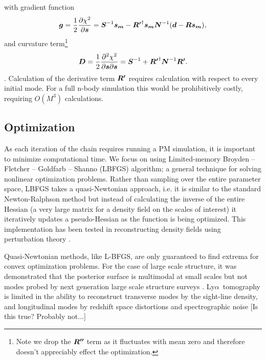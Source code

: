 \documentclass[usenatbib,onecolumn]{mnras}
\def\bi#1{\hbox{\boldmath{$#1$}}}
\newcommand{\lya}{Ly$\alpha$}
\begin{document}
with gradient function
\begin{equation}
\bi{g}=\frac{1}{2}\frac{\partial \chi^2}{\partial \bi{s}}=\bi{S}^{-1}\bi{s_m}-\bi{R'}^\dag\bi{s_m}\bi{N}^{-1}(\bi{d}-\bi{Rs_m}),
\label{eq_cost}
\end{equation}
and curvature term\footnote{Note we drop the $\bi{R''}$ term as it fluctuates with mean zero and therefore doesn't appreciably effect the optimization.} 
\begin{equation}
\bi{D}=\frac{1}{2}\frac{\partial^2 \chi^2}{\partial \bi{s}\partial \bi{s}}=\bi{S}^{-1}+\bi{R'}^\dag\bi{N}^{-1}\bi{R'}. %
\label{eq_curv}
\end{equation}.
Calculation of the derivative term $\bi{R'}$ requires calculation with respect to every initial mode. For a full n-body simulation this would be prohibitively costly, requiring  $O(M^3)$ calculations. 


\subsection{Optimization }
As each iteration of the chain requires running a PM simulation, it is important to minimize computational time. We focus on using Limited-memory Broyden – Fletcher – Goldfarb – Shanno (LBFGS) algorithm;\cite{NumRec} a general technique for solving nonlinear optimization problems. Rather than sampling over the entire parameter space, LBFGS takes a quasi-Newtonian approach, i.e. it is similar to the standard Newton-Ralphson method but instead of calculating the inverse of the entire Hessian (a very large matrix for a density field on the scales of interest) it iteratively updates a pseudo-Hessian as the function is being optimized. This implementation has been tested in reconstructing density fields using perturbation theory \cite{seljak2017towards}.

Quasi-Newtonian methods, like L-BFGS, are only guaranteed to find extrema for convex optimization problems. For the case of large scale structure, it was demonstrated that the posterior surface is multimodal at small scales but not modes probed by next generation large scale structure surveys \cite{2018fengseljakzaldarriaga}. \lya\ tomography is limited in the ability to reconstruct transverse modes by the sight-line density, and longitudinal modes by redshift space distortions and spectrographic noise [Is this true? Probably not...] 
\end{document}
